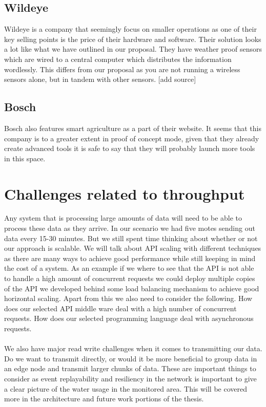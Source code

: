 \documentclass[]{uiophd}
\begin{document}
\subsection{Wildeye}
Wildeye is a company that seemingly focus on smaller operations as one of their key selling points is the price of their hardware and software. Their solution looks a lot like what we have outlined in our proposal. They have weather proof sensors which are wired to a central computer which distributes the information wordlessly. This differs from our proposal as you are not running a wireless sensors alone, but in tandem with other sensors. [add source]

\subsection{Bosch}
Bosch also features smart agriculture as a part of their website. It seems that this company is to a greater extent in proof of concept mode, given that they already create advanced tools it is safe to say that they will probably launch more tools in this space.

\section{Challenges related to throughput}

Any system that is processing large amounts of data will need to be able to process these data as they arrive. In our scenario we had five motes sending out data every 15-30 minutes. But we still spent time thinking about whether or not our approach is scalable. We will talk about API scaling with different techniques as there are many ways to achieve good performance while still keeping in mind the cost of a system. As an example if we where to see that the API is not able to handle a high amount of concurrent requests we could deploy multiple copies of the API we developed behind some load balancing mechanism to achieve good horizontal scaling. Apart from this we also need to consider the following. How does our selected API middle ware deal with a high number of concurrent requests. How does our selected programming language deal with asynchronous requests.
\\\\
We also have major read write challenges when it comes to transmitting our data. Do we want to transmit directly, or would it be more beneficial to group data in an edge node and transmit larger chunks of data. These are important things to consider as event replayability and resiliency in the network is important to give a clear picture of the water usage in the monitored area. This will be covered more in the architecture and future work portions of the thesis.
\end{document}
